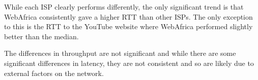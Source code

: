 \documentclass{sig-alternate-05-2015}
\begin{document}
\begin{table}
	\caption{Offset from median RTT to content (ms, lower is better)}
	\label{table:OffsetFromMedianPingToContent}
\end{table}

\begin{table}
	\caption{Offset from median throughput (KB/s, higher is better)}
	\label{table:OffsetFromMedianThroughput}
\end{table}
While each ISP clearly performs differently, the only significant trend is that WebAfrica consistently gave a higher RTT than other ISPs. The only exception to this is the RTT to the YouTube website where WebAfrica performed slightly better than the median.

The differences in throughput are not significant and while there are some significant differences in latency, they are not consistent and so are likely due to external factors on the network.
\end{document}
